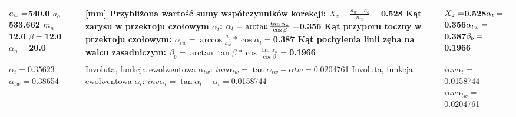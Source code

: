 \documentclass{article}%
\begin{document}
\begin{longtable}{|p{3cm}|p{7cm}|p{3cm}|}
$ \newline \newline \newline  a_w = $540.0 \newline  \newline $a_o = $533.662 \newline  \newline $m_n = $12.0 \newline  \newline $\beta = $12.0 \newline  \newline $\alpha_n = $20.0& [mm]  \newline \newline Przybliżona wartość sumy współczynników korekcji: \newline$X_z = \frac{a_w - a_o}{m_n} = $0.528  \newline \newline Kąt zarysu w przekroju czołowym $\alpha_t$: $ \newline \alpha_t = \arctan{\frac{\tan{\alpha_n}}{\cos{\beta}}} = $0.356  \newline \newline Kąt przyporu toczny w przekroju czołowym: \newline$\alpha_{tw} = \arccos{\frac{a_o}{a_w}*\cos{\alpha_t}} = $0.387  \newline \newline Kąt pochylenia linii zęba na walcu zasadniczym: \newline$\beta_b = \arctan{\tan{\beta} * \cos{\frac{\tan{\alpha_n}}{\cos{\beta}}}} = $0.1966&$ \newline X_z = $0.528$ \newline  \newline \alpha_t = $0.356$ \newline  \newline  \newline \alpha_{tw} = $0.387$ \newline  \newline \beta_b = $0.1966\\%
\hline%
 \newline  \newline $\alpha_t = $0.35623 \newline  \newline $\alpha_{tw} = $0.38654&  \newline \newline Involuta, funkcja ewolwentowa $\alpha_{tw}$: \newline $inv\alpha_{tw} = \tan{\alpha_{tw}} - \alpha{tw} = $0.0204761  \newline \newline Involuta, funkcja ewolwentowa $\alpha_{t}$: \newline $inv\alpha_t = \tan{\alpha_t} - \alpha_t = $0.0158744& \newline \newline  $inv\alpha_t = $0.0158744 \newline  \newline $inv\alpha_{tw} = $0.0204761\\%

\end{longtable}
\end{document}
